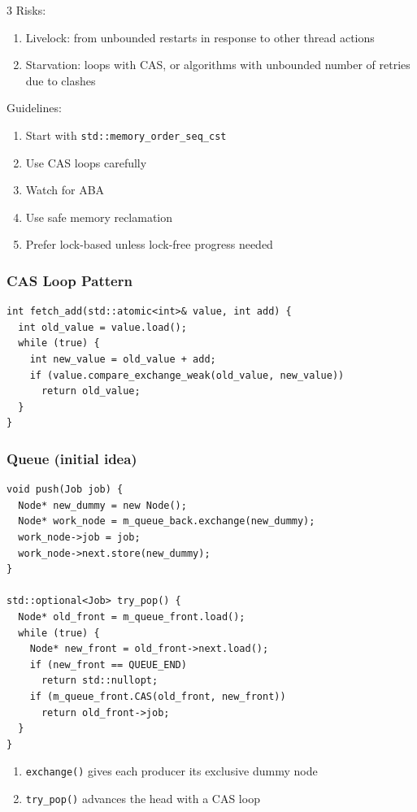 \documentclass[12pt, a4paper]{article}
\begin{document}
\begin{multicols*}{3}
Risks:
\begin{enumerate}[\roman*.]
  \item Livelock: from unbounded restarts in response to other thread actions
  \item Starvation: loops with CAS, or algorithms with unbounded number of retries due to clashes
\end{enumerate}

Guidelines:
\begin{enumerate}[\roman*.]
  \item Start with \lstinline|std::memory_order_seq_cst|
  \item Use CAS loops carefully
  \item Watch for ABA
  \item Use safe memory reclamation
  \item Prefer lock-based unless lock-free progress needed
\end{enumerate}

\subsubsection{CAS Loop Pattern}
\begin{lstlisting}[basicstyle=\ttfamily\scriptsize]
int fetch_add(std::atomic<int>& value, int add) {
  int old_value = value.load();
  while (true) {
    int new_value = old_value + add;
    if (value.compare_exchange_weak(old_value, new_value))
      return old_value;
  }
}
\end{lstlisting}\vspace{-1em}

\subsubsection{Queue (initial idea)}
\begin{lstlisting}[basicstyle=\ttfamily\scriptsize]
void push(Job job) {
  Node* new_dummy = new Node();
  Node* work_node = m_queue_back.exchange(new_dummy);
  work_node->job = job;
  work_node->next.store(new_dummy);
}

std::optional<Job> try_pop() {
  Node* old_front = m_queue_front.load();
  while (true) {
    Node* new_front = old_front->next.load();
    if (new_front == QUEUE_END)
      return std::nullopt;
    if (m_queue_front.CAS(old_front, new_front))
      return old_front->job;
  }
}
\end{lstlisting}
\begin{enumerate}[$\bullet$]
  \item \lstinline|exchange()| gives each producer its exclusive dummy node
  \item \lstinline|try_pop()| advances the head with a CAS loop
\end{enumerate}


\end{multicols*}
\end{document}
